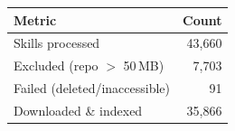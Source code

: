 \begin{tabular}{lr}
  \toprule
  \textbf{Metric} & \textbf{Count} \\
  \midrule
  Skills processed              & 43,660 \\
  Excluded (repo $>$ 50\,MB)    & 7,703 \\
  Failed (deleted/inaccessible) & 91 \\
  Downloaded \& indexed         & 35,866 \\
  \bottomrule
\end{tabular}

